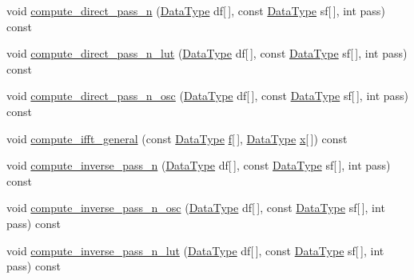 \begin{DoxyCompactItemize}
\item 
void \hyperlink{classffft_1_1FFTReal_a9ac801815332d3abd86ff1d7703f07e3}{compute\+\_\+direct\+\_\+pass\+\_\+n} (\hyperlink{classffft_1_1FFTReal_a606148f1cf8c3b7d705473932fc063d1}{Data\+Type} df\mbox{[}$\,$\mbox{]}, const \hyperlink{classffft_1_1FFTReal_a606148f1cf8c3b7d705473932fc063d1}{Data\+Type} sf\mbox{[}$\,$\mbox{]}, int pass) const 
\item 
void \hyperlink{classffft_1_1FFTReal_a91a4417bf6cff9a6af23f8538675a885}{compute\+\_\+direct\+\_\+pass\+\_\+n\+\_\+lut} (\hyperlink{classffft_1_1FFTReal_a606148f1cf8c3b7d705473932fc063d1}{Data\+Type} df\mbox{[}$\,$\mbox{]}, const \hyperlink{classffft_1_1FFTReal_a606148f1cf8c3b7d705473932fc063d1}{Data\+Type} sf\mbox{[}$\,$\mbox{]}, int pass) const 
\item 
void \hyperlink{classffft_1_1FFTReal_a388e0b14379bf9bf2c4e182713fee311}{compute\+\_\+direct\+\_\+pass\+\_\+n\+\_\+osc} (\hyperlink{classffft_1_1FFTReal_a606148f1cf8c3b7d705473932fc063d1}{Data\+Type} df\mbox{[}$\,$\mbox{]}, const \hyperlink{classffft_1_1FFTReal_a606148f1cf8c3b7d705473932fc063d1}{Data\+Type} sf\mbox{[}$\,$\mbox{]}, int pass) const 
\item 
void \hyperlink{classffft_1_1FFTReal_a62f005d553d75a8e3910e3c1d4401466}{compute\+\_\+ifft\+\_\+general} (const \hyperlink{classffft_1_1FFTReal_a606148f1cf8c3b7d705473932fc063d1}{Data\+Type} \hyperlink{FFTReal__readme_8txt_abbf3cc73d1e3e4714ab1639819396eca}{f}\mbox{[}$\,$\mbox{]}, \hyperlink{classffft_1_1FFTReal_a606148f1cf8c3b7d705473932fc063d1}{Data\+Type} \hyperlink{FFTReal__readme_8txt_a9c92ac89d1560f812393ca39a19e581e}{x}\mbox{[}$\,$\mbox{]}) const 
\item 
void \hyperlink{classffft_1_1FFTReal_ad392e218433964045a809dcfd49d0ddf}{compute\+\_\+inverse\+\_\+pass\+\_\+n} (\hyperlink{classffft_1_1FFTReal_a606148f1cf8c3b7d705473932fc063d1}{Data\+Type} df\mbox{[}$\,$\mbox{]}, const \hyperlink{classffft_1_1FFTReal_a606148f1cf8c3b7d705473932fc063d1}{Data\+Type} sf\mbox{[}$\,$\mbox{]}, int pass) const 
\item 
void \hyperlink{classffft_1_1FFTReal_a054d36f2f7bacf4bfa78c615d4fb491c}{compute\+\_\+inverse\+\_\+pass\+\_\+n\+\_\+osc} (\hyperlink{classffft_1_1FFTReal_a606148f1cf8c3b7d705473932fc063d1}{Data\+Type} df\mbox{[}$\,$\mbox{]}, const \hyperlink{classffft_1_1FFTReal_a606148f1cf8c3b7d705473932fc063d1}{Data\+Type} sf\mbox{[}$\,$\mbox{]}, int pass) const 
\item 
void \hyperlink{classffft_1_1FFTReal_a9a91e58a78284fcb3f76ec6c33ac63a4}{compute\+\_\+inverse\+\_\+pass\+\_\+n\+\_\+lut} (\hyperlink{classffft_1_1FFTReal_a606148f1cf8c3b7d705473932fc063d1}{Data\+Type} df\mbox{[}$\,$\mbox{]}, const \hyperlink{classffft_1_1FFTReal_a606148f1cf8c3b7d705473932fc063d1}{Data\+Type} sf\mbox{[}$\,$\mbox{]}, int pass) const 

\end{DoxyCompactItemize}
